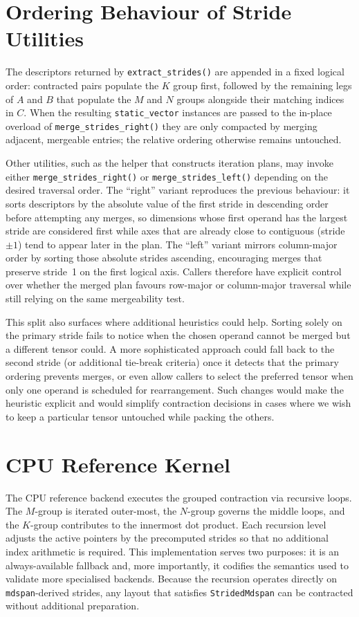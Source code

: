 \documentclass[11pt]{article}
\begin{document}
\section{Ordering Behaviour of Stride Utilities}
The descriptors returned by \texttt{extract\_strides()} are appended in a fixed logical order:
contracted pairs populate the $K$ group first, followed by the remaining legs of $A$ and $B$ that
populate the $M$ and $N$ groups alongside their matching indices in $C$.  When the resulting
\texttt{static\_vector} instances are passed to the in-place overload of
\texttt{merge\_strides\_right()} they are only compacted by merging adjacent, mergeable entries;
the relative ordering otherwise remains untouched.

Other utilities, such as the helper that constructs iteration plans, may invoke either
\texttt{merge\_strides\_right()} or \texttt{merge\_strides\_left()} depending on the desired
traversal order.  The ``right'' variant reproduces the previous behaviour: it sorts descriptors by
the absolute value of the first stride in descending order before attempting any merges, so
dimensions whose first operand has the largest stride are considered first while axes that are
already close to contiguous (stride~$\pm 1$) tend to appear later in the plan.  The ``left'' variant
mirrors column-major order by sorting those absolute strides ascending, encouraging merges that
preserve stride~1 on the first logical axis.  Callers therefore have explicit control over whether
the merged plan favours row-major or column-major traversal while still relying on the same
mergeability test.

This split also surfaces where additional heuristics could help.  Sorting solely on the primary
stride fails to notice when the chosen operand cannot be merged but a different tensor could.  A
more sophisticated approach could fall back to the second stride (or additional tie-break criteria)
once it detects that the primary ordering prevents merges, or even allow callers to select the
preferred tensor when only one operand is scheduled for rearrangement.  Such changes would make
the heuristic explicit and would simplify contraction decisions in cases where we wish to keep a
particular tensor untouched while packing the others.

\section{CPU Reference Kernel}
The CPU reference backend executes the grouped contraction via recursive loops.  The $M$-group is
iterated outer-most, the $N$-group governs the middle loops, and the $K$-group contributes to the
innermost dot product.  Each recursion level adjusts the active pointers by the precomputed strides
so that no additional index arithmetic is required.  This implementation serves two purposes: it is
an always-available fallback and, more importantly, it codifies the semantics used to validate more
specialised backends.  Because the recursion operates directly on \texttt{mdspan}-derived strides,
any layout that satisfies \texttt{StridedMdspan} can be contracted without additional preparation.
\end{document}
